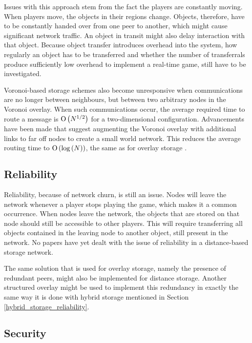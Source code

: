Issues with this approach stem from the fact the players are constantly moving. When players move, the objects in their regions change. Objects,
therefore, have to be constantly handed over from one peer to another, which might cause significant network traffic. An object in transit might also
delay interaction with that object. Because object transfer introduces overhead into the system, how regularly an object has to be transferred and
whether the number of transferrals produce sufficiently low overhead to implement a real-time game, still have to be investigated.

Voronoi-based storage schemes also become unresponsive when communications are no longer between neighbours, but between two arbitrary nodes in the
Voronoi overlay. When such communications occur, the average required time to route a message is $\operatorname{O}\left(N^{1/2}\right)$ for a two-dimensional configuration.
Advancements have been made that suggest augmenting the Voronoi overlay with additional links to far off nodes to create a small world network. This
reduces the average routing time to $\operatorname{O}\left(\log{(N)}\right)$, the same as for overlay storage \cite{Steiner_voronoi_shortcuts}.

\subsection{Reliability}

Reliability, because of network churn, is still an issue. Nodes will leave the network whenever a player stops playing the game, which makes it a
common occurrence. When nodes leave the network, the objects that are stored on that node should still be accessible to other players. This will
require transferring all objects contained in the leaving node to another object, still present in the network. No papers have yet dealt with the
issue of reliability in a distance-based storage network.

The same solution that is used for overlay storage, namely the presence of redundant peers, might also be implemented for distance storage. Another
structured overlay might be used to implement this redundancy in exactly the same way it is done with hybrid storage mentioned in Section
\ref{hybrid_storage_reliability}.

\subsection{Security}
\label{distance_based_storage_security}

